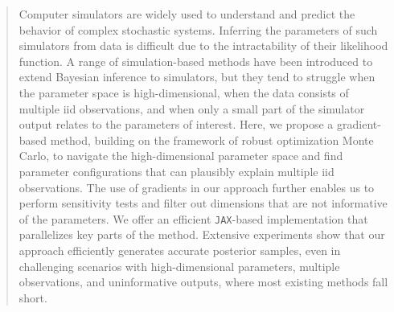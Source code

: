 \documentclass[twoside]{article}
\begin{document}
%

%


\begin{abstract}
Computer simulators are widely used to understand and predict the behavior of complex stochastic systems. Inferring the parameters of such simulators from data is difficult due to the intractability of their likelihood function. 
%
A range of simulation-based methods have been introduced to extend Bayesian inference to simulators,
%
but they tend to struggle when the parameter space is high-dimensional, when the data consists of multiple iid observations, and when only a small part of the simulator output relates to the parameters of interest.
%
Here, we propose a gradient-based method, building on the framework of robust optimization Monte Carlo, to navigate the high-dimensional parameter space and find parameter configurations that can plausibly explain multiple iid observations. The use of gradients in our approach further enables us to perform sensitivity tests and filter out dimensions that are not informative of the parameters. 
%
We offer an efficient \texttt{JAX}-based implementation that parallelizes key parts of the method.
%
Extensive experiments show that our approach efficiently generates accurate posterior samples, even in challenging scenarios with high-dimensional parameters, multiple observations, and uninformative outputs, where most existing methods fall short.

\end{abstract}
\end{document}
